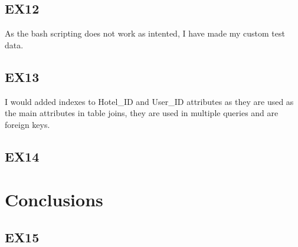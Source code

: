 \documentclass{article}
\begin{document}
	\subsection{EX12}
	As the bash scripting does not work as intented, I have made my custom test data.
	\subsection{EX13}
	I would added indexes to Hotel\_ID and User\_ID attributes as they are used as the main attributes in table joins, they are used in multiple queries and are foreign keys.
	
	\subsection{EX14}
	
	
	\section{Conclusions}
	
	\subsection{EX15}
\end{document}
